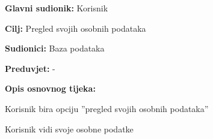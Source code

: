 					\noindent {}
					\begin{packed_item}
	
						\item \textbf{Glavni sudionik: }  Korisnik
						\item  \textbf{Cilj:} Pregled svojih osobnih podataka
						\item  \textbf{Sudionici:} Baza podataka
						\item  \textbf{Preduvjet:} -
						\item  \textbf{Opis osnovnog tijeka:} 
						
						
						\item[] \begin{packed_enum}
	
							\item Korisnik bira opciju ”pregled svojih osobnih podataka”				
							\item Korisnik vidi svoje osobne podatke
							
						\end{packed_enum}
					\end{packed_item}

